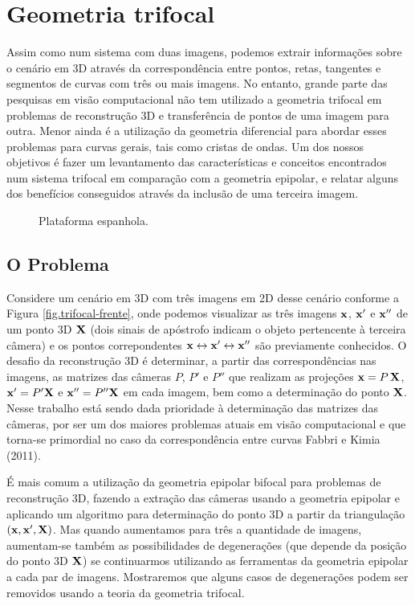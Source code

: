 \newpage
\chapter{Geometria trifocal}\label{sec.geo-tri}
Assim como num sistema com duas imagens, podemos extrair informações sobre o cenário em 3D através da correspondência entre pontos, retas, tangentes e segmentos de curvas com três  ou mais imagens. No entanto, grande parte das pesquisas em visão computacional não tem utilizado a geometria trifocal em problemas de reconstrução 3D e transferência de pontos de uma imagem para outra. Menor ainda é a utilização da geometria diferencial para abordar esses problemas para curvas gerais, tais como cristas de ondas. Um dos nossos objetivos é fazer um levantamento das características e conceitos encontrados num sistema trifocal em comparação com a geometria epipolar, e relatar alguns dos benefícios conseguidos através da inclusão de uma terceira imagem.
\begin{figure}[htb!]{\textwidth}
\caption{Plataforma espanhola.}
\hfill
{}\hfill
{}\hfill
{}
\end{figure}
\section{O Problema}
Considere um cenário em 3D com três imagens em 2D desse cenário conforme a Figura \ref{fig.trifocal-frente}, onde podemos visualizar as três imagens $\mathbf{x}$, $\mathbf{x}'$ e $\mathbf{x}''$ de um ponto 3D $\mathbf{X}$ (dois sinais de apóstrofo indicam o objeto pertencente à terceira câmera) e os pontos correpondentes $\mathbf{x}\leftrightarrow\mathbf{x}'\leftrightarrow\mathbf{x}''$ são previamente conhecidos. O desafio da reconstrução 3D é determinar, a partir das correspondências nas imagens, as matrizes das câmeras $P$, $P'$ e $P''$ que realizam as projeções $\mathbf{x}=P\,\mathbf{X}$, $\mathbf{x}'=P'\mathbf{X}$ e $\mathbf{x}''=P''\mathbf{X}$ em cada imagem, bem como a determinação do ponto $\mathbf{X}$. Nesse trabalho está sendo dada prioridade à determinação das matrizes das câmeras, por ser um dos maiores problemas atuais em visão computacional e que torna-se primordial no caso da correspond\^encia entre curvas Fabbri e Kimia (2011).

É mais comum a utilização da geometria epipolar bifocal para problemas de reconstrução 3D, fazendo a extração das câmeras usando a geometria epipolar e aplicando um algoritmo para determinação do ponto 3D a partir da triangulação $(\mathbf{x},\mathbf{x}',\mathbf{X})$. Mas quando aumentamos para três a quantidade de imagens, aumentam-se também as possibilidades de degenerações (que depende  da posição do ponto 3D $\mathbf{X}$) se continuarmos utilizando as ferramentas da geometria epipolar a cada par de imagens. Mostraremos que alguns casos de degenerações podem ser removidos usando a teoria da geometria trifocal.


